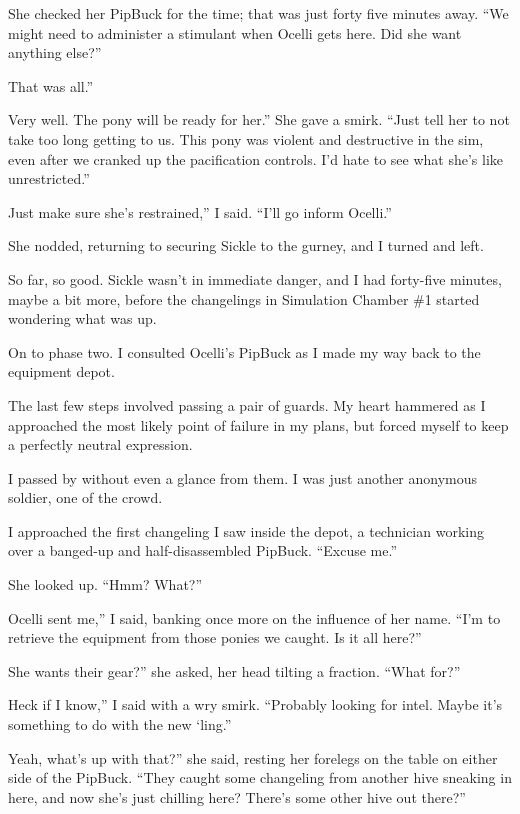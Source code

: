 She checked her PipBuck for the time; that was just forty five minutes away. “We might need to administer a stimulant when Ocelli gets here. Did she want anything else?”

\leavevmode{}That was all.”

\leavevmode{}Very well. The pony will be ready for her.” She gave a smirk. “Just tell her to not take too long getting to us. This pony was violent and destructive in the sim, even after we cranked up the pacification controls. I’d hate to see what she’s like unrestricted.”

\leavevmode{}Just make sure she’s restrained,” I said. “I’ll go inform Ocelli.”

She nodded, returning to securing Sickle to the gurney, and I turned and left.

So far, so good. Sickle wasn’t in immediate danger, and I had forty-five minutes, maybe a bit more, before the changelings in Simulation Chamber \#1 started wondering what was up.

On to phase two. I consulted Ocelli’s PipBuck as I made my way back to the equipment depot.

The last few steps involved passing a pair of guards. My heart hammered as I approached the most likely point of failure in my plans, but forced myself to keep a perfectly neutral expression.

I passed by without even a glance from them. I was just another anonymous soldier, one of the crowd.

I approached the first changeling I saw inside the depot, a technician working over a banged-up and half-disassembled PipBuck. “Excuse me.”

She looked up. “Hmm? What?”

\leavevmode{}Ocelli sent me,” I said, banking once more on the influence of her name. “I’m to retrieve the equipment from those ponies we caught. Is it all here?”

\leavevmode{}She wants their gear?” she asked, her head tilting a fraction. “What for?”

\leavevmode{}Heck if I know,” I said with a wry smirk. “Probably looking for intel. Maybe it’s something to do with the new ‘ling.”

\leavevmode{}Yeah, what’s up with that?” she said, resting her forelegs on the table on either side of the PipBuck. “They caught some changeling from another hive sneaking in here, and now she’s just chilling here? There’s some other hive out there?”


